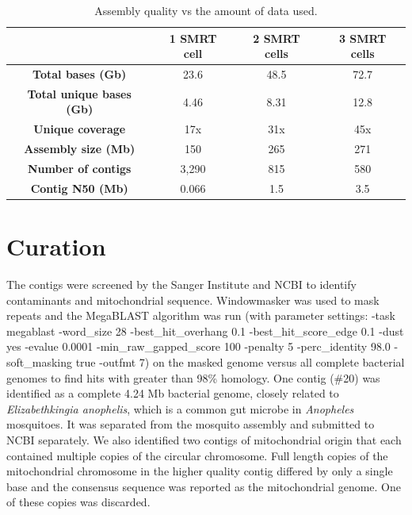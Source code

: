 \begin{table}[htbp!]
\caption{Assembly quality vs the amount of data used.}\label{table:smrtcells}
\begin{tabular}{| c | c | c | c |}
\hline
 & \textbf{1 SMRT cell} & \textbf{2 SMRT cells} & \textbf{3 SMRT cells} \\\hline
 \textbf{Total bases (Gb)} & 23.6 & 48.5 & 72.7 \\\hline
  \textbf{Total unique bases (Gb)} & 4.46 & 8.31 & 12.8 \\\hline 
  \textbf{Unique coverage} & 17x & 31x & 45x \\\hline 
  \textbf{Assembly size (Mb)} & 150 & 265 & 271 \\\hline 
  \textbf{Number of contigs} & 3,290 & 815 & 580 \\\hline 
  \textbf{Contig N50 (Mb)} & 0.066 & 1.5 & 3.5 \\\hline
\end{tabular}
\end{table}




\section{Curation}

\par{
The contigs were screened by the Sanger Institute and NCBI to identify contaminants and mitochondrial sequence\cite{sangercuration}. Windowmasker was used to mask repeats and the MegaBLAST algorithm was run (with parameter settings: -task megablast -word\_size 28 -best\_hit\_overhang 0.1 -best\_hit\_score\_edge 0.1 -dust yes -evalue 0.0001 -min\_raw\_gapped\_score 100 -penalty 5 -perc\_identity 98.0 -soft\_masking true -outfmt 7) on the masked genome versus all complete bacterial genomes to find hits with  greater than 98\% homology\cite{windowmasker}\cite{megablast}. One contig (\#20) was identified as a complete 4.24 Mb bacterial genome, closely related to \textit{Elizabethkingia anophelis}, which is a common gut microbe in \textit{Anopheles} mosquitoes\cite{kingia}\cite{blobtoolkit}. It was separated from the mosquito assembly and submitted to NCBI separately. We also identified two contigs of mitochondrial origin that each contained multiple copies of the circular chromosome. Full length copies of the mitochondrial chromosome in the higher quality contig differed by only a single base and the consensus sequence was reported as the mitochondrial genome. One of these copies was discarded.
} 

